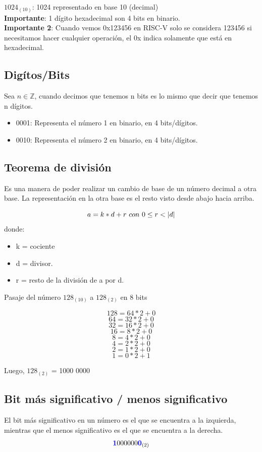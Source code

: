 \documentclass[10pt,a4paper]{article}
\begin{document}
\(1024_{(10)}\): 1024 representado en base 10 (decimal) \\

\textbf{Importante}: 1 dígito hexadecimal son 4 bits en binario. \\
\textbf{Importante 2}: Cuando vemos 0x123456 en RISC-V solo se considera 123456 si necesitamos hacer cualquier operación, el 0x indica solamente que está en hexadecimal.

    
\subsection*{Digítos/Bits}
Sea \( n \in \mathbb{Z} \), cuando decimos que tenemos n bits es lo mismo que decir que tenemos n dígitos.
\\
\begin{itemize}
\item 0001: Representa el número 1 en binario, en 4 bits/dígitos.
\item 0010: Representa el número 2 en binario, en 4 bits/dígitos.
\end{itemize}

\subsection*{Teorema de división}
Es una manera de poder realizar un cambio de base de un número decimal a otra base. La representación en la otra base es el resto visto desde abajo hacia arriba.

\[a = k \ast d + r \ con \ 0 \le r < |d|\] donde:
\begin{itemize}
    \item k = cociente
    \item d = divisor.
    \item r = resto de la división de a por d.
  \end{itemize}

Pasaje del número \(128_{(10)}\) a \(128_{(2)}\) en 8 bits

\[128 = 64 \ast 2 + 0\]
\[64 = 32 \ast 2 + 0\]
\[32 = 16 \ast 2 + 0\]
\[16 = 8 \ast 2 + 0\]
\[8 = 4 \ast 2 + 0\]
\[4 = 2 \ast 2 + 0\]
\[2 = 1 \ast 2 + 0\]
\[1 = 0 \ast 2 + 1\]

Luego, \(128_{(2)}\) = 1000 0000

\subsection*{Bit más significativo / menos significativo}
El bit más significativo en un número es el que se encuentra a la izquierda, mientras que el menos significativo es el que se encuentra a la derecha.
\[\textcolor{blue}{\textbf{1}}000 000\textcolor{blue}{\textbf{0}}_{(2)}\]
\end{document}
